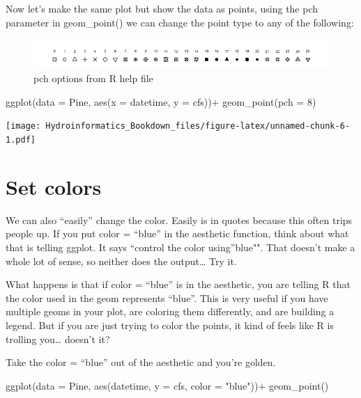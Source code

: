 \documentclass[
]{book}
\newenvironment{Shaded}{\begin{snugshade}}{\end{snugshade}}
\newcommand{\AttributeTok}[1]{\textcolor[rgb]{0.77,0.63,0.00}{#1}}
\newcommand{\DecValTok}[1]{\textcolor[rgb]{0.00,0.00,0.81}{#1}}
\newcommand{\FunctionTok}[1]{\textcolor[rgb]{0.00,0.00,0.00}{#1}}
\newcommand{\NormalTok}[1]{#1}
\newcommand{\SpecialCharTok}[1]{\textcolor[rgb]{0.00,0.00,0.00}{#1}}
\newcommand{\StringTok}[1]{\textcolor[rgb]{0.31,0.60,0.02}{#1}}
\begin{document}
Now let's make the same plot but show the data as points, using the pch parameter in geom\_point() we can change the point type to any of the following:

\begin{figure}
\centering
\includegraphics{images/pch.png}
\caption{pch options from R help file}
\end{figure}

\begin{Shaded}
\begin{Highlighting}[]
\FunctionTok{ggplot}\NormalTok{(}\AttributeTok{data =}\NormalTok{ Pine, }\FunctionTok{aes}\NormalTok{(}\AttributeTok{x =}\NormalTok{ datetime, }\AttributeTok{y =}\NormalTok{ cfs))}\SpecialCharTok{+}
  \FunctionTok{geom\_point}\NormalTok{(}\AttributeTok{pch =} \DecValTok{8}\NormalTok{)}
\end{Highlighting}
\end{Shaded}

\texttt{[image: Hydroinformatics\_Bookdown\_files/figure-latex/unnamed-chunk-6-1.pdf]}

\hypertarget{set-colors}{%
\section{Set colors}\label{set-colors}}

We can also ``easily'' change the color. Easily is in quotes because this often trips people up. If you put color = ``blue'' in the aesthetic function, think about what that is telling ggplot. It says ``control the color using''blue"". That doesn't make a whole lot of sense, so neither does the output\ldots{} Try it.

What happens is that if color = ``blue'' is in the aesthetic, you are telling R that the color used in the geom represents ``blue''. This is very useful if you have multiple geoms in your plot, are coloring them differently, and are building a legend. But if you are just trying to color the points, it kind of feels like R is trolling you\ldots{} doesn't it?

Take the color = ``blue'' out of the aesthetic and you're golden.

\begin{Shaded}
\begin{Highlighting}[]
\FunctionTok{ggplot}\NormalTok{(}\AttributeTok{data =}\NormalTok{ Pine, }\FunctionTok{aes}\NormalTok{(datetime, }\AttributeTok{y =}\NormalTok{ cfs, }\AttributeTok{color =} \StringTok{"blue"}\NormalTok{))}\SpecialCharTok{+}
  \FunctionTok{geom\_point}\NormalTok{()}
\end{Highlighting}
\end{Shaded}
\end{document}

